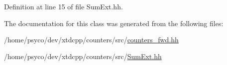 Definition at line 15 of file Sum\+Ext.\+hh.



The documentation for this class was generated from the following files\+:\begin{DoxyCompactItemize}
\item 
/home/psyco/dev/xtdcpp/counters/src/\hyperlink{counters__fwd_8hh}{counters\+\_\+fwd.\+hh}\item 
/home/psyco/dev/xtdcpp/counters/src/\hyperlink{SumExt_8hh}{Sum\+Ext.\+hh}\end{DoxyCompactItemize}
